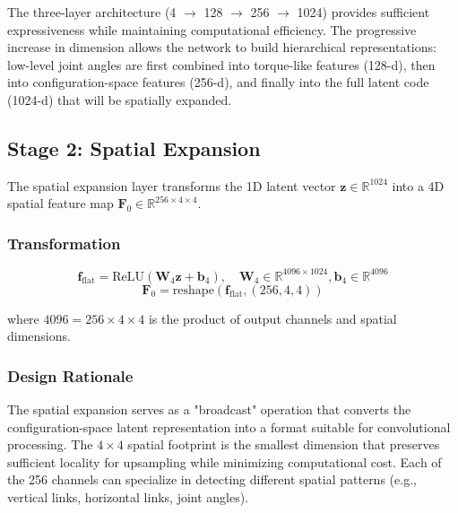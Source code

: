 \documentclass[12pt,a4paper,oneside]{report}
\begin{document}
The three-layer architecture (4 $\rightarrow$ 128 $\rightarrow$ 256 $\rightarrow$ 1024) provides sufficient expressiveness while maintaining computational efficiency. The progressive increase in dimension allows the network to build hierarchical representations: low-level joint angles are first combined into torque-like features (128-d), then into configuration-space features (256-d), and finally into the full latent code (1024-d) that will be spatially expanded.

\subsection{Stage 2: Spatial Expansion}
\label{subsec:stage_2_spatial_expansion}

The spatial expansion layer transforms the 1D latent vector $\mathbf{z} \in \mathbb{R}^{1024}$ into a 4D spatial feature map $\mathbf{F}_0 \in \mathbb{R}^{256 \times 4 \times 4}$.

\subsubsection{Transformation}
\label{subsubsec:transformation}

\begin{equation}
\mathbf{f}_{\text{flat}} = \text{ReLU}(\mathbf{W}_4 \mathbf{z} + \mathbf{b}_4), \quad \mathbf{W}_4 \in \mathbb{R}^{4096 \times 1024}, \mathbf{b}_4 \in \mathbb{R}^{4096}
\end{equation}
\begin{equation}
\mathbf{F}_0 = \text{reshape}(\mathbf{f}_{\text{flat}}, (256, 4, 4))
\end{equation}

where $4096 = 256 \times 4 \times 4$ is the product of output channels and spatial dimensions.

\subsubsection{Design Rationale}
\label{subsubsec:design_rationale_1}

The spatial expansion serves as a "broadcast" operation that converts the configuration-space latent representation into a format suitable for convolutional processing. The $4 \times 4$ spatial footprint is the smallest dimension that preserves sufficient locality for upsampling while minimizing computational cost. Each of the 256 channels can specialize in detecting different spatial patterns (e.g., vertical links, horizontal links, joint angles).
\end{document}
